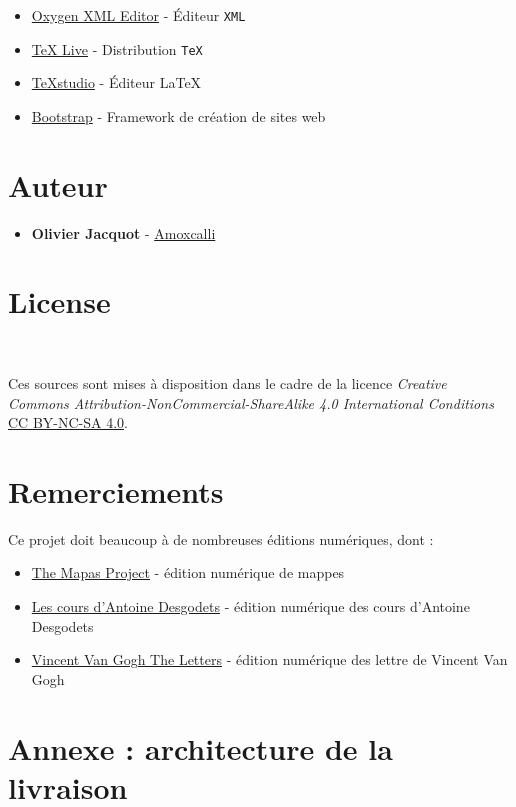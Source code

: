 \documentclass[a4paper,twoside,12pt]{article}
\begin{document}
\begin{itemize}
	\item
	\href{https://www.oxygenxml.com/}{Oxygen XML Editor} - \'Editeur \texttt{XML}
	\item
	\href{http://www.tug.org/texlive/}{TeX Live} - Distribution \texttt{TeX}
	\item
	\href{https://www.texstudio.org/}{TeXstudio} - \'Editeur \LaTeX
	\item
	\href{https://getbootstrap.com/}{Bootstrap} - Framework de cr\'eation de sites web
\end{itemize}

\section{Auteur}

\begin{itemize}
	\item
	\textbf{Olivier Jacquot} -
	\href{https://github.com/olivierjacquot}{Amoxcalli}
\end{itemize}

\section{License}\

Ces sources sont mises \`a disposition dans le cadre de la licence \emph{Creative Commons Attribution-NonCommercial-ShareAlike 4.0 International Conditions}
\href{https://creativecommons.org/licenses/by-nc-sa/4.0/deed.fr}{CC BY-NC-SA 4.0}.

\section{Remerciements}

Ce projet doit beaucoup \`a de nombreuses \'editions num\'eriques, dont :

\begin{itemize}
	\item \href{https://mapas.uoregon.edu/}{The Mapas Project} - \'edition
	num\'erique de mappes
	\item \href{http://www.desgodets.net/}{Les cours d'Antoine Desgodets} -
	\'edition num\'erique des cours d'Antoine Desgodets
	\item \href{http://vangoghletters.org}{Vincent Van Gogh The Letters} -
	\'edition num\'erique des lettre de Vincent Van Gogh
\end{itemize}

\section{Annexe : architecture de la livraison}\label{annexe}
\end{document}
